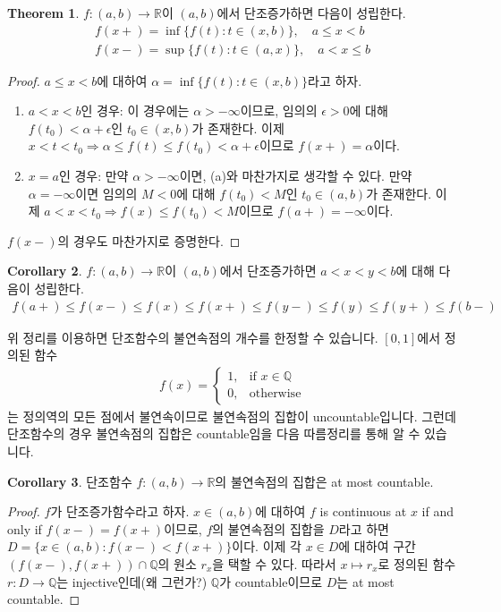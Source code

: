 \documentclass[12pt]{article}
\theoremstyle{definition}
\newtheorem{thm}{Theorem}[section]
\newtheorem{cor}[thm]{Corollary}
\def\RR{\mathbb{R}}
\def\eps{\epsilon}
\begin{document}
\begin{thm}
	\(f: (a, b) \rightarrow \RR\)이 \((a, b)\)에서 단조증가하면 다음이 성립한다.
	\begin{gather*}
		f(x+) = \inf\{f(t): t \in (x, b)\}, \quad a \le x < b\\
		f(x-) = \sup\{f(t): t \in (a, x)\}, \quad a < x \le b
	\end{gather*}
\end{thm}
\begin{proof}
	\(a \le x < b\)에 대하여 \(\alpha = \inf\{f(t): t \in (x, b)\}\)라고 하자.
	\begin{enumerate} [label=(\alph*), leftmargin=2\parindent]
		\item
		\(a < x < b\)인 경우: 이 경우에는 \(\alpha > -\infty\)이므로, 임의의 \(\eps > 0\)에 대해 \(f(t_0) < \alpha + \eps\)인 \(t_0 \in (x, b)\)가 존재한다. 이제 \(x < t < t_0 \Longrightarrow \alpha \le f(t) \le f(t_0) < \alpha + \eps\)이므로 \(f(x+) = \alpha\)이다. 
		\item
		\(x = a\)인 경우: 만약 \(\alpha > -\infty\)이면, (a)와 마찬가지로 생각할 수 있다. 만약 \(\alpha = -\infty\)이면 임의의 \(M < 0\)에 대해 \(f(t_0) < M\)인 \(t_0 \in (a, b)\)가 존재한다. 이제 \(a < x < t_0 \Longrightarrow f(x) \le f(t_0) < M\)이므로 \(f(a+) = -\infty\)이다.
	\end{enumerate}
	\(f(x-)\)의 경우도 마찬가지로 증명한다.
\end{proof}

\begin{cor} \label{limit}
	\(f: (a, b) \rightarrow \RR\)이 \((a, b)\)에서 단조증가하면 \(a < x < y < b\)에 대해 다음이 성립한다. 
	\begin{gather*}
		f(a+) \le f(x-) \le f(x) \le f(x+) \le f(y-) \le f(y) \le f(y+) \le f(b-)
	\end{gather*}
\end{cor}

위 정리를 이용하면 단조함수의 불연속점의 개수를 한정할 수 있습니다. \([0, 1]\)에서 정의된 함수
\begin{gather*}
	f(x)=
	\begin{cases}
		1, &\text{if } x \in \mathbb{Q}\\
		0, &\text{otherwise}
	\end{cases}
\end{gather*}
는 정의역의 모든 점에서 불연속이므로 불연속점의 집합이 uncountable입니다. 그런데 단조함수의 경우 불연속점의 집합은 countable임을 다음 따름정리를 통해 알 수 있습니다.

\begin{cor}
	단조함수 \(f: (a, b) \rightarrow \RR\)의 불연속점의 집합은 at most countable.
\end{cor}
\begin{proof}
	\(f\)가 단조증가함수라고 하자. \(x \in (a, b)\)에 대하여 \(f\) is continuous at \(x\) if and only if \(f(x-) = f(x+)\)이므로, \(f\)의 불연속점의 집합을 \(D\)라고 하면 \(D = \{x \in (a, b): f(x-) < f(x+)\}\)이다. 이제 각 \(x \in D\)에 대하여 구간 \((f(x-), f(x+)) \cap \mathbb{Q}\)의 원소 \(r_x\)을 택할 수 있다. 따라서 \(x \mapsto r_x\)로 정의된 함수 \(r:D \rightarrow \mathbb{Q}\)는 injective인데(왜 그런가?) \(\mathbb{Q}\)가 countable이므로 \(D\)는 at most countable.
\end{proof}
\end{document}
